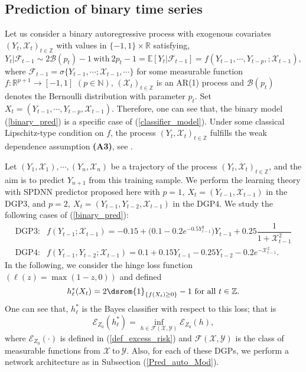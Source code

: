 \documentclass[10pt,twoside]{article}
\numberwithin{equation}{section}
\newcommand{\E}{\ensuremath{\mathbb{E}}}
\newcommand{\R}{\ensuremath{\mathbb{R}}}
\newcommand{\Z}{\ensuremath{\mathbb{Z}}}
\newcommand{\N}{\ensuremath{\mathbb{N}}}
\def \ind{\textrm{\dsrom{1}}}
\begin{document}
\subsection{Prediction of binary time series}
Let us consider a binary autoregressive process with exogenous covariates $(Y_t, \mathcal{X}_t)_{t\in \Z} $ with values  in  $\{-1, 1\} \times \R$ satisfying, 
%
\begin{equation}\label{binary_pred}
Y_t \vert \mathcal{F}_{t - 1} \sim  2\mathcal{B} (p_t) - 1 ~ \text{with} ~ 2 p_t - 1  = \E [Y_t \vert \mathcal{F}_ {t -1 }] = f(Y_ {t-1},  \cdots,  Y_ {t - p}, ; \mathcal{X}_{t - 1}),
\end{equation}
%
where $\mathcal{F}_ {t-1} = \sigma \{Y_ {t-1}, \cdots ; \mathcal{X}_ {t-1}, \cdots\}$ for some measurable function $f: \R^{p+1} \rightarrow [-1, 1]$ $(p \in \N)$, $(\mathcal{X}_t)_{t\in \Z}$ is an AR(1) process and $\mathcal{B} (p_t)$ denotes the Bernoulli distribution with parameter $p_t$.
%
Set $X_t =  (Y_ {t - 1}, \cdots, Y_ {t-p}, \mathcal{X}_ {t-1}) $. Therefore, one can see that, the binary model (\ref{binary_pred}) is a specific case of (\ref{classifier_model}). Under some classical Lipschitz-type condition on $f$, the process $(Y_t, \mathcal{X}_t)_{t\in \Z} $ fulfills the weak dependence  assumption \textbf{(A3)}, see \cite{kengne2023deep}. 


\medskip

Let $(Y_1, \mathcal{X}_1), \cdots, (Y_n, \mathcal{X}_n)$ be a trajectory of the process $(Y_t, \mathcal{X}_t)_ {t \in \Z} $, and the aim is to predict $ Y_{n+1} $ from this training sample.
%
We perform the learning theory with SPDNN predictor proposed here with
$p = 1, ~ X_t = (Y_ {t - 1}, \mathcal{X}_{t - 1})$ in the DGP3, and $p = 2,  ~ X_t = (Y_{t-1}, Y_{t-2}, \mathcal{X}_ {t-1})$ in the DGP4. We study the following cases of (\ref{binary_pred}):
%
\[
\begin{array}{ll}
\text{DGP3}:    &  f(Y_ {t-1}; \mathcal{X}_ {t-1})  = -0.15 + \big( 0.1 -0.2e^{-0.5Y_{t-1}^2}  \big) Y_{t-1} + 0.25 \dfrac{1}{ 1 + \mathcal{X}_{t - 1}^2} \\
\text{DGP4}:    & f(Y_ {t-1}, Y_ {t-2} ; \mathcal{X}_ {t-1}) = 0.1 + 0.15 Y_ {t - 1} -0.25 Y_ {t - 2}  -0.2e^{-\mathcal{X}_ {t-1}^2}.
\end{array}
\]
%
 In the following, we consider the  hinge loss  function $(\ell(z) = \max(1-z, 0))$  and defined 
\begin{equation}
h_{\ell}^{*} (X_t) = 2 \ind_{\{f(X_t) \ge 0\}} - 1 ~ \text{for all} ~ t\in \Z.
\end{equation}
%
One can see that, $h_{\ell}^{*}$ is the Bayes classifier with respect to this loss; that is                
\[ \mathcal{E}_{Z_0} (h_{\ell}^{*})  = \underset{h\in \mathcal{F}(\mathcal{X}, \mathcal{Y})}{\inf} \mathcal{E}_{Z_0} (h),  \]
%
where $\mathcal{E}_{Z_0}(\cdot)$ is defined in (\ref{def_excess_risk}) 
and $ \mathcal{F}(\mathcal{X}, \mathcal{Y}) $ is the class of measurable functions from $\mathcal{X} ~ \text{to} ~ \mathcal{Y} $.
%
Also, for each of these DGPs, we perform a network architecture as in Subsection (\ref{Pred_auto_Mod}).
\end{document}
